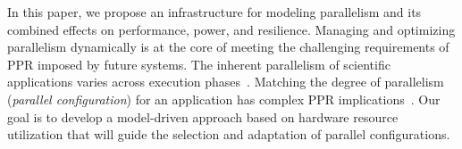 \documentclass{article}  %
\begin{document}

In this paper, we propose an infrastructure for modeling parallelism
and its combined effects on performance, power, and resilience. Managing 
and optimizing parallelism dynamically is at the core of meeting the 
challenging requirements of PPR imposed by future systems. The inherent 
parallelism of scientific applications varies across execution 
phases~\cite{nvram_ipdps12}.  Matching the degree of parallelism 
(\textit{parallel configuration}) for an application has complex PPR 
implications~\cite{mpiopenmp_ipdps10, mpiopenmp_tpds13, dsn_pact08, dsn_ics06}.
Our goal is to develop a model-driven approach based on hardware resource 
utilization that will guide the selection and adaptation of parallel 
configurations.





\end{document}
